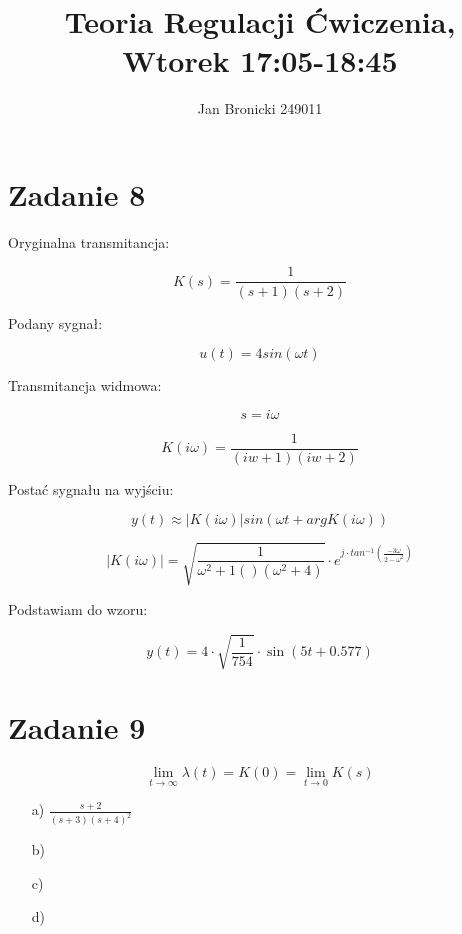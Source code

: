 \documentclass{article}
\title{Teoria Regulacji Ćwiczenia, Wtorek 17:05-18:45}
\author{Jan Bronicki 249011 }
\date{}
\begin{document}
\maketitle

\section*{Zadanie 8}

Oryginalna transmitancja:

$$ K(s) = \frac{1}{\left(s + 1\right) \left(s + 2\right)} $$

Podany sygnał:

$$ u(t) = 4sin(\omega t) $$

Transmitancja widmowa:

$$ s = i\omega $$

$$K(i\omega) = \frac{1}{\left(i w + 1\right) \left(i w + 2\right)}$$

Postać sygnału na wyjściu:

$$y(t)\approx\left|K(i\omega)\right|sin\left(\omega t + argK(i \omega)\right)$$



$$ \left|K(i\omega)\right| = \sqrt{\frac{1}{\omega^{2}+1()(\omega^{2}+4)}}\cdot e^{j\cdot 
tan^{-1}\left(\frac{-3\omega}{2-\omega^{2}}\right)} $$

Podstawiam do wzoru:

$$y(t)=4\cdot \sqrt{\frac{1}{754}}\cdot \sin\left(5t+0.577\right)$$


\section*{Zadanie 9}

$$ \lim\limits_{t \to \infty} \lambda(t) = K(0) = \lim\limits_{t \to 0} K(s)  $$

\begin{itemize}
    \item[a)] $\frac{s+2}{(s+3)(s+4)^{2}}$
    
    \item[b)]
    
    \item[c)]
    
    \item[d)]   
\end{itemize}
\end{document}
